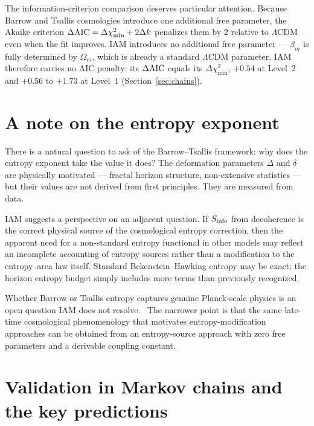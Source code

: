 The information-criterion comparison deserves particular attention. Because Barrow and Tsallis cosmologies introduce one additional free parameter, the
Akaike criterion $\Delta{\rm AIC}=\Delta\chi^2_{\min}+2\Delta k$ penalizes them by $2$ relative to $\Lambda$CDM even when the fit improves. IAM introduces
no additional free parameter --- $\beta_m$ is fully determined by $\Omega_m$, which is already a standard $\Lambda$CDM parameter. IAM therefore carries no
AIC penalty: its $\Delta{\rm AIC}$ equals its $\Delta\chi^2_{\min}$, $+0.54$ at Level~2 and $+0.56$ to $+1.73$ at Level~1 (Section~\ref{sec:chains}). \calc

\section{A note on the entropy exponent}\label{sec:eg_exponent}
There is a natural question to ask of the Barrow--Tsallis framework: why does the entropy exponent take the value it does? The deformation parameters $\Delta$
and $\delta$ are physically motivated --- fractal horizon structure, non-extensive statistics --- but their values are not derived from first principles.
They are measured from data. \openprob

IAM suggests a perspective on an adjacent question. If $S_{\rm info}$ from decoherence is the correct physical source of the cosmological entropy
correction, then the apparent need for a non-standard entropy functional in other models may reflect an incomplete accounting of entropy sources rather
than a modification to the entropy--area law itself. Standard Bekenstein--Hawking entropy may be exact; the horizon entropy budget simply includes more
terms than previously recognized. \conjecture

Whether Barrow or Tsallis entropy captures genuine Planck-scale physics is an open question IAM does not resolve. \openprob\ The narrower point is that the
same late-time cosmological phenomenology that motivates entropy-modification approaches can be obtained from an entropy-source approach with zero free
parameters and a derivable coupling constant. \interp

\section{Validation in Markov chains and the key predictions}\label{sec:eg_validation}
